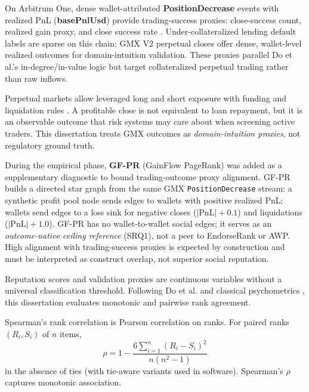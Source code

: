 
On Arbitrum One, dense wallet-attributed \textbf{PositionDecrease} events with realized PnL (\textbf{basePnlUsd}) provide trading-success proxies: close-success count, realized gain proxy, and close success rate . Under-collateralized lending default labels are sparse on this chain; GMX V2 perpetual closes offer dense, wallet-level realized outcomes for domain-intuition validation. These proxies parallel Do et al.'s in-degree/in-value logic but target collateralized perpetual trading rather than raw inflows.

Perpetual markets allow leveraged long and short exposure with funding and liquidation rules . A profitable close is not equivalent to loan repayment, but it is an observable outcome that risk systems may care about when screening active traders. This dissertation treats GMX outcomes as \emph{domain-intuition proxies}, not regulatory ground truth.


During the empirical phase, \textbf{GF-PR} (GainFlow PageRank) was added as a supplementary diagnostic to bound trading-outcome proxy alignment. GF-PR builds a directed star graph from the same GMX \texttt{PositionDecrease} stream: a synthetic profit pool node sends edges to wallets with positive realized PnL; wallets send edges to a loss sink for negative closes ($|\text{PnL}|+0.1$) and liquidations ($|\text{PnL}|+1.0$). GF-PR has no wallet-to-wallet social edges; it serves as an \emph{outcome-native ceiling reference} (SRQ1), not a peer to EndorseRank or AWP. High alignment with trading-success proxies is expected by construction and must be interpreted as construct overlap, not superior social reputation.


Reputation scores and validation proxies are continuous variables without a universal classification threshold. Following Do et al. and classical psychometrics , this dissertation evaluates monotonic and pairwise rank agreement.

Spearman's rank correlation  is Pearson correlation on ranks. For paired ranks $(R_i,S_i)$ of $n$ items,
\begin{equation}
\rho = 1 - \frac{6\sum_{i=1}^n (R_i-S_i)^2}{n(n^2-1)}
\label{eq:spearman}
\end{equation}
in the absence of ties (with tie-aware variants used in software). Spearman's $\rho$ captures monotonic association.

